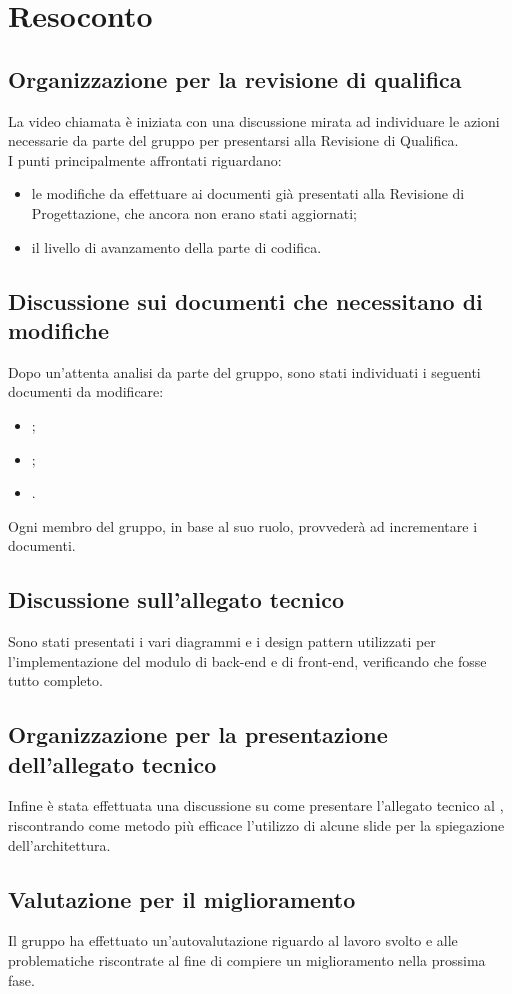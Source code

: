 \section{Resoconto}
\subsection{Organizzazione per la revisione di qualifica}
La video chiamata è iniziata con una discussione mirata ad individuare le azioni necessarie da parte del gruppo per presentarsi alla Revisione di Qualifica. \\
I punti principalmente affrontati riguardano:
\begin{itemize}
\item le modifiche da effettuare ai documenti già presentati alla Revisione di Progettazione, che ancora non erano stati aggiornati;
\item il livello di avanzamento della parte di codifica.
\end{itemize}
\subsection{Discussione sui documenti che necessitano di modifiche}
Dopo un'attenta analisi da parte del gruppo, sono stati individuati i seguenti documenti da modificare:
\begin{itemize}
\item {};
\item {};
\item {}.
\end{itemize}
Ogni membro del gruppo, in base al suo ruolo, provvederà ad incrementare i documenti.
\subsection{Discussione sull'allegato tecnico}
Sono stati presentati i vari diagrammi e i design pattern utilizzati per l'implementazione del modulo di back-end e di front-end, verificando che fosse tutto completo.
\subsection{Organizzazione per la presentazione dell'allegato tecnico}
Infine è stata effettuata una discussione su come presentare l'allegato tecnico al \CR , riscontrando come metodo più efficace l'utilizzo di alcune slide per la spiegazione dell'architettura.
\subsection{Valutazione per il miglioramento}
Il gruppo ha effettuato un'autovalutazione riguardo al lavoro svolto e alle problematiche riscontrate al fine di compiere un miglioramento nella prossima fase.
